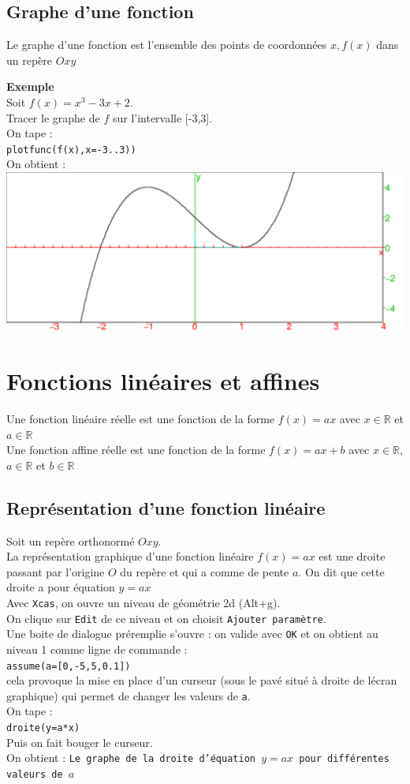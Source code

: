\documentclass[a4paper,11pt]{book}
\newcommand{\R}{{\mathbb{R}}}
\begin{document}
\section{Graphe d'une fonction}
Le graphe d'une fonction est l'ensemble des points de coordonn\'ees 
$x,f(x)$ dans un rep\`ere $Oxy$

{\bf Exemple}\\
Soit $f(x)=x^3-3x+2$.\\
Tracer le graphe de $f$ sur l'intervalle [-3,3].\\
On tape :\\
{\tt plotfunc(f(x),x=-3..3))}\\
On obtient :\\
\includegraphics[width=\textwidth]{graphef}
\chapter{Fonctions lin\'eaires et affines}
Une fonction lin\'eaire r\'eelle est une fonction de la forme $f(x)=ax$ avec 
$x\in \R$ et $a\in \R$\\
Une fonction affine r\'eelle est une fonction de la forme $f(x)=ax+b$ avec 
$x\in \R$, $a\in \R$ et $b\in \R$ \\
\section{Repr\'esentation d'une fonction lin\'eaire}
Soit un rep\`ere orthonorm\'e $Oxy$.\\
La repr\'esentation graphique d'une fonction lin\'eaire $f(x)=ax$ est une 
droite passant par l'origine $O$ du rep\`ere et qui a comme de pente $a$.
On dit que cette droite a pour \'equation $y=ax$\\
Avec {\tt Xcas}, on ouvre un niveau de g\'eom\'etrie 2d (Alt+g).\\
On clique sur {\tt Edit} de ce niveau et on choisit {\tt Ajouter param\`etre}.\\
Une boite de dialogue pr\'eremplie s'ouvre : on valide avec {\tt OK} et on 
obtient au niveau 1 comme ligne de commande :\\
{\tt assume(a=[0,-5,5,0.1])}\\
cela provoque la mise en place d'un curseur (sous le pav\'e situ\'e \`a 
droite de l\'ecran graphique) qui permet de changer les valeurs de {\tt a}.\\
On tape :\\
{\tt droite(y=a*x)}\\
Puis on fait bouger le curseur.\\
On obtient : {\tt Le graphe de la droite d'\'equation $y=ax$ pour diff\'erentes valeurs de $a$}\\
\end{document}
